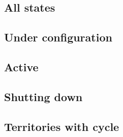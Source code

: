 \documentclass[12pt,a4paper]{article}
\begin{document}
\subsection{All states}

\subsection{Under configuration}

\subsection{Active}

\subsection{Shutting down}

\subsection{Territories with cycle}


\end{document}
